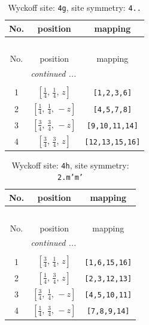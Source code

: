 \documentclass[fleqn,8pt]{jsarticle}
\begin{document}
\renewcommand{\arraystretch}{1.2}
\begin{longtable}{ccc}
\caption{Wyckoff site: {\tt 4g}, site symmetry: {\tt 4..}}
 \\
 \hline \hline
No. & position & mapping \\ \hline \endfirsthead

\multicolumn{2}{l}{\tablename\ \thetable{}} \\
 \hline \hline
No. & position & mapping \\ \hline \endhead

 \hline \hline
\multicolumn{2}{r}{\footnotesize\it continued ...} \\ \endfoot

 \hline \hline
\multicolumn{2}{r}{} \\ \endlastfoot

1 & $\left[ \frac{1}{4},\, \frac{1}{4},\, z \right]$ & {\tt [1,2,3,6]} \\ \hline
2 & $\left[ \frac{1}{4},\, \frac{1}{4},\, - z \right]$ & {\tt [4,5,7,8]} \\ \hline
3 & $\left[ \frac{3}{4},\, \frac{3}{4},\, - z \right]$ & {\tt [9,10,11,14]} \\ \hline
4 & $\left[ \frac{3}{4},\, \frac{3}{4},\, z \right]$ & {\tt [12,13,15,16]} \\
\end{longtable}
\renewcommand{\arraystretch}{1.2}
\begin{longtable}{ccc}
\caption{Wyckoff site: {\tt 4h}, site symmetry: {\tt 2.m'm'}}
 \\
 \hline \hline
No. & position & mapping \\ \hline \endfirsthead

\multicolumn{2}{l}{\tablename\ \thetable{}} \\
 \hline \hline
No. & position & mapping \\ \hline \endhead

 \hline \hline
\multicolumn{2}{r}{\footnotesize\it continued ...} \\ \endfoot

 \hline \hline
\multicolumn{2}{r}{} \\ \endlastfoot

1 & $\left[ \frac{3}{4},\, \frac{1}{4},\, z \right]$ & {\tt [1,6,15,16]} \\ \hline
2 & $\left[ \frac{1}{4},\, \frac{3}{4},\, z \right]$ & {\tt [2,3,12,13]} \\ \hline
3 & $\left[ \frac{3}{4},\, \frac{1}{4},\, - z \right]$ & {\tt [4,5,10,11]} \\ \hline
4 & $\left[ \frac{1}{4},\, \frac{3}{4},\, - z \right]$ & {\tt [7,8,9,14]} \\
\end{longtable}
\end{document}
